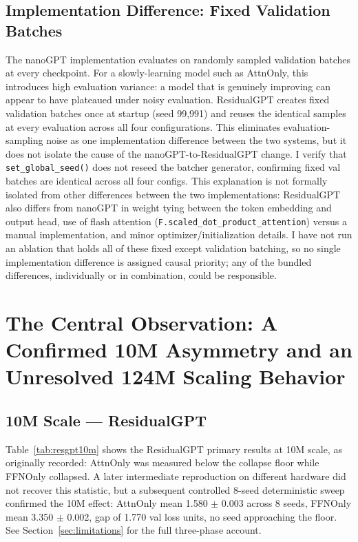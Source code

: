 \documentclass[11pt]{article}
\begin{document}
\subsection{Implementation Difference: Fixed Validation Batches}
The nanoGPT implementation evaluates on randomly sampled validation batches at every checkpoint. For a slowly-learning model such as AttnOnly, this introduces high evaluation variance: a model that is genuinely improving can appear to have plateaued under noisy evaluation. ResidualGPT creates fixed validation batches once at startup (seed 99{,}991) and reuses the identical samples at every evaluation across all four configurations. This eliminates evaluation-sampling noise as one implementation difference between the two systems, but it does not isolate the cause of the nanoGPT-to-ResidualGPT change. I verify that \texttt{set\_global\_seed()} does not reseed the batcher generator, confirming fixed val batches are identical across all four configs. This explanation is not formally isolated from other differences between the two implementations: ResidualGPT also differs from nanoGPT in weight tying between the token embedding and output head, use of flash attention (\texttt{F.scaled\_dot\_product\_attention}) versus a manual implementation, and minor optimizer/initialization details. I have not run an ablation that holds all of these fixed except validation batching, so no single implementation difference is assigned causal priority; any of the bundled differences, individually or in combination, could be responsible.

\section{The Central Observation: A Confirmed 10M Asymmetry and an Unresolved 124M Scaling Behavior}
\subsection{10M Scale --- ResidualGPT}
Table~\ref{tab:resgpt10m} shows the ResidualGPT primary results at 10M scale, as originally recorded: AttnOnly was measured below the collapse floor while FFNOnly collapsed. A later intermediate reproduction on different hardware did not recover this statistic, but a subsequent controlled 8-seed deterministic sweep confirmed the 10M effect: AttnOnly mean 1.580 $\pm$ 0.003 across 8 seeds, FFNOnly mean 3.350 $\pm$ 0.002, gap of 1.770 val loss units, no seed approaching the floor. See Section~\ref{sec:limitations} for the full three-phase account.
\end{document}
